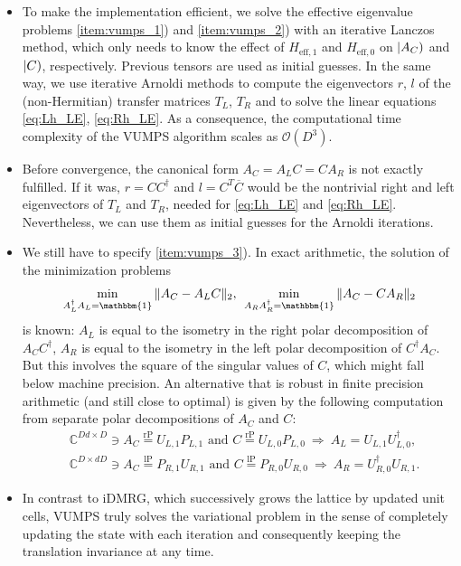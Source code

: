 \begin{itemize}
	\item To make the implementation efficient, we solve the effective eigenvalue problems \ref{item:vumps_1}) and \ref{item:vumps_2}) with an iterative Lanczos method, which only needs to know the effect of $H_{\mathrm{eff}, 1}$ and $H_{\mathrm{eff}, 0}$ on $\left| A_C \right)$ and $\left| C \right)$, respectively. Previous tensors are used as initial guesses. In the same way, we use iterative Arnoldi methods to compute the eigenvectors $r$, $l$ of the (non-Hermitian) transfer matrices $T_L$, $T_R$ and to solve the linear equations \eqref{eq:Lh_LE}, \eqref{eq:Rh_LE}. As a consequence, the computational time complexity of  the VUMPS algorithm scales as $\mathcal{O}(D^3)$.
	\item Before convergence, the canonical form $A_C = A_L C = C A_R$ is not exactly fulfilled. If it was, $r = C C^{\dagger}$ and $l = C^T \overline{C}$ would be the nontrivial right and left eigenvectors of $T_L$ and $T_R$, needed for \eqref{eq:Lh_LE} and \eqref{eq:Rh_LE}. Nevertheless, we can use them as initial guesses for the Arnoldi iterations.
	\item We still have to specify \ref{item:vumps_3}). In exact arithmetic, the solution of the minimization problems 
\begin{equation}
	\min_{A_L^{\dagger} A_L = \mathbbm{1}} \Vert A_C - A_L C\Vert_2, \:\: \min_{A_R A_R^{\dagger} = \mathbbm{1}} \Vert A_C - C A_R \Vert_2
\end{equation}
is known: $A_L$ is equal to the isometry in the right polar decomposition of $A_C C^{\dagger}$, $A_R$ is equal to the isometry in the left polar decomposition of $C^{\dagger} A_C$. But this involves the square of the singular values of $C$, which might fall below machine precision. An alternative that is robust in finite precision arithmetic (and still close to optimal) is given by the following computation from separate polar decompositions of $A_C$ and $C$:
\begin{align}
	& \mathbb{C}^{Dd \times D} \owns A_C \overset{\mathrm{rP}}{=} U_{L, 1} P_{L, 1} \text{ and } C \overset{\mathrm{rP}}{=} U_{L, 0} P_{L, 0} \: \Rightarrow \: A_L = U_{L, 1} U_{L, 0}^{\dagger}, \\
	& \mathbb{C}^{D \times dD} \owns A_C \overset{\mathrm{lP}}{=} P_{R, 1} U_{R, 1} \text{ and } C \overset{\mathrm{lP}}{=} P_{R, 0} U_{R, 0} \: \Rightarrow \: A_R = U_{R, 0}^{\dagger} U_{R, 1}.
\end{align}
	\item In contrast to iDMRG, which successively grows the lattice by updated unit cells, VUMPS truly solves the variational problem in the sense of completely updating the state with each iteration and consequently keeping the translation invariance at any time.
\end{itemize}

